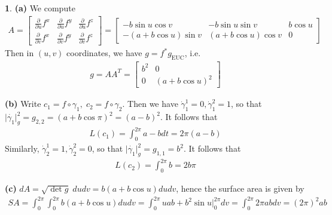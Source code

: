 \documentclass[10.5pt]{article}
\theoremstyle{definition}
\newtheorem{pb}{}
\newcommand{\abs}[1]{\lvert#1\rvert}
\newcommand{\paru}{\frac{\partial}{\partial u}}
\newcommand{\parv}{\frac{\partial}{\partial v}}
\begin{document}
    \begin{pb}
        \textbf{(a)} We compute
        \begin{align*}
            A = \begin{bmatrix} \paru f^x & \paru f^y & \paru f^z \\
                \parv f^x & \parv f^y & \parv f^z  \end{bmatrix}
            = \begin{bmatrix} -b\sin u\cos v & -b\sin u \sin v &b\cos u\\
            -(a+b\cos u)\sin v & (a+b\cos u)\cos v & 0 \end{bmatrix}
        \end{align*}
        Then in \((u,v)\) coordinates, we have \(g = f^* g_{\text{EUC}}\), i.e.
        \begin{align*}
            g = AA^T = \begin{bmatrix} b^2 & 0 \\ 0 & (a+b\cos u)^2 \end{bmatrix}
        \end{align*}

        \textbf{(b)} Write \(c_1 = f\circ \gamma_1, \; c_2 = f\circ \gamma_2\). Then we have
        \(\dot{\gamma}_1^1 = 0, \dot{\gamma}_1^2 = 1\), so that \(\abs{\dot{\gamma_1}}^2_g = g_{2,2} = (a+b\cos \pi)^2 = (a-b)^2\). It follows that
        \begin{align*}
            L(c_1) = \int_0^{2\pi} a-b dt = 2\pi(a-b)
        \end{align*}
        Similarly, \(\dot{\gamma}_2^1 = 1, \dot{\gamma}_2^2 = 0\), so that \(\abs{\dot{\gamma_1}}^2_g = g_{1,1} = b^2\). It follows that
        \begin{align*}
            L(c_2) = \int_0^{2\pi}b = 2b\pi
        \end{align*}

        \textbf{(c)}
        \(dA = \sqrt{\det g}\;dudv = b(a+b\cos u)dudv\), hence the surface area is given by
        \begin{align*}
            SA = \int_0^{2\pi}\int_0^{2\pi}b(a+b\cos u)dudv = \int_0^{2\pi} uab + b^2\sin u\vert_0^{2\pi}dv = \int_0^{2\pi} 2\pi abdv = (2\pi)^2ab
        \end{align*}
    \end{pb}
\end{document}
